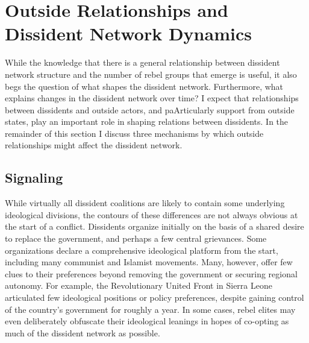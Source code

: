 
\section{Outside Relationships and Dissident Network Dynamics}

While the knowledge that there is a general relationship between dissident network structure and the number of rebel groups that emerge is useful, it also begs the question of what shapes the dissident network. Furthermore, what explains changes in the dissident network over time? I expect that relationships between dissidents and outside actors, and paArticularly support from outside states, play an important role in shaping relations between dissidents. In the remainder of this section I discuss three mechanisms by which outside relationships might affect the dissident network.

\subsection{Signaling}

While virtually all dissident coalitions are likely to contain some underlying ideological divisions, the contours of these differences are not always obvious at the start of a conflict. Dissidents organize initially on the basis of a shared desire to replace the government, and perhaps a few central grievances. Some organizations declare a  comprehensive ideological platform from the start, including many communist and Islamist movements. Many, however, offer few clues to their preferences beyond removing the government or securing regional autonomy. For example, the Revolutionary United Front in Sierra Leone articulated few ideological positions or policy preferences, despite gaining control of the country's government for roughly a year. In some cases, rebel elites may even deliberately obfuscate their ideological leanings in hopes of co-opting as much of the dissident network as possible.

